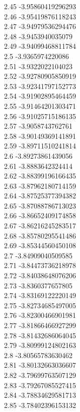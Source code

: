 {2.45	-3.95860419296293\\
2.46	-3.95419876118243\\
2.47	-3.94979536294476\\
2.48	-3.9453940035079\\
2.49	-3.94099468811784\\
2.5	-3.9365974220086\\
2.51	-3.9322022104023\\
2.52	-3.92780905850919\\
2.53	-3.92341797152773\\
2.54	-3.91902895464459\\
2.55	-3.91464201303471\\
2.56	-3.91025715186135\\
2.57	-3.9058743762761\\
2.58	-3.90149369141891\\
2.59	-3.89711510241814\\
2.6	-3.89273861439056\\
2.61	-3.8883642324414\\
2.62	-3.88399196166435\\
2.63	-3.87962180714159\\
2.64	-3.87525377394382\\
2.65	-3.87088786713023\\
2.66	-3.86652409174858\\
2.67	-3.86216245283517\\
2.68	-3.85780295541486\\
2.69	-3.85344560450108\\
2.7	-3.84909040509585\\
2.71	-3.84473736218978\\
2.72	-3.84038648076206\\
2.73	-3.8360377657805\\
2.74	-3.83169122220149\\
2.75	-3.82734685497005\\
2.76	-3.82300466901981\\
2.77	-3.81866466927299\\
2.78	-3.81432686064045\\
2.79	-3.80999124802163\\
2.8	-3.80565783630462\\
2.81	-3.80132663036607\\
2.82	-3.79699763507129\\
2.83	-3.79267085527415\\
2.84	-3.78834629581713\\
2.85	-3.78402396153132\\
}
